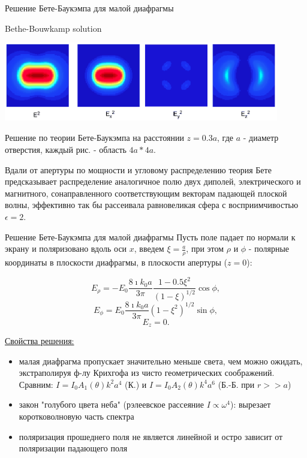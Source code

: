 \documentclass[9pt, compress, xcolor=table]{beamer}
\begin{document}
\begin{frame}{Решение Бете-Баукэмпа для малой диафрагмы}

Bethe-Bouwkamp solution

\begin{center}
\includegraphics[width=0.9\textwidth]{bb}
\end{center}
Решение по теории Бете-Баукэмпа на расстоянии $z=0.3 a$, где $a$ - диаметр отверстия, каждый рис. - область $4a*4a$.

Вдали от апертуры по мощности и угловому распределению теория Бете предсказывает распределение аналогичное полю двух диполей, электрического  и магнитного, сонаправленного соответствующим векторам падающей плоской волны, эффективно так бы рассеивала равновеликая сфера с восприимчивостью $\epsilon=2$. 

\end{frame}

\begin{frame}{Решение Бете-Баукэмпа для малой диафрагмы}
Пусть поле падает по нормали к экрану и поляризовано вдоль оси $x$, введем $\xi = \frac{a}{\rho}$, при этом $\rho$ и $\phi$ - полярные координаты в плоскости диафрагмы, в плоскости апертуры ($z=0$):

\begin{equation*}
E_{\rho} = -E_0\frac{8\imath k_0 a}{3\pi}\frac{1-0.5\xi^2}{(1-\xi)^{1/2}}\cos \phi,
\end{equation*}
\begin{equation*}
E_{\phi} = E_0\frac{8\imath k_0 a}{3\pi}(1-\xi^2)^{1/2}\sin \phi,
\end{equation*}
\begin{equation*}
E_{z} = 0.
\end{equation*}

\underline{Свойства решения:}
\begin{itemize}
\item малая диафрагма пропускает значительно меньше света, чем можно ожидать, экстраполируя ф-лу Крихгофа из чисто геометрических соображений. Сравним: $I=I_0 A_1(\theta) k^2a^4$ (К.) и $I=I_0 A_2(\theta) k^4a^6$ (Б.-Б. при $r>>a$)
\item закон "голубого цвета неба" (рэлеевское рассеяние $I \propto \omega^4$): вырезает коротковолновую часть спектра
\item поляризация прошеднего поля не является линейной и остро зависит от поляризации падающего поля
\end{itemize}
\end{frame}
\end{document}
